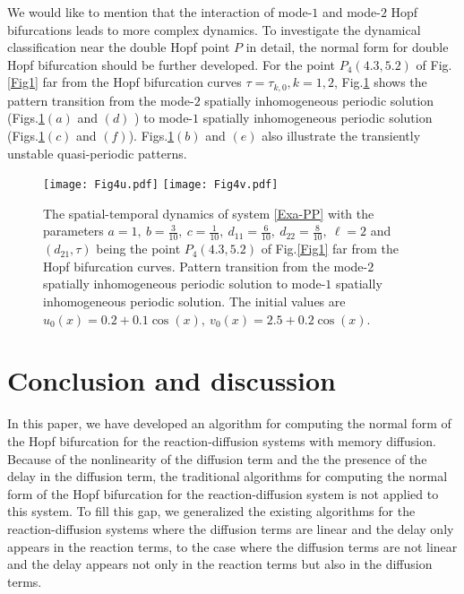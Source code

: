 \documentclass[11pt]{article}
\theoremstyle{definition}
\theoremstyle{remark}
\numberwithin{equation}{section}
\begin{document}
We would like to mention that  the interaction of  mode-$1$ and mode-$2$ Hopf bifurcations leads to more complex dynamics.    To investigate the dynamical classification near the double Hopf point $P$ in detail, the normal form for double Hopf bifurcation should be further developed.   For the point $P_4(4.3, 5.2)$ of  Fig.\ref{Fig1} far from the Hopf bifurcation curves $\tau=\tau_{k, 0}, k=1, 2$, Fig.\ref{Fig4} shows the pattern transition from the  mode-$2$ spatially inhomogeneous periodic solution (Figs.\ref{Fig4}$(a)$ and $(d)$  )  to mode-$1$ spatially inhomogeneous periodic solution (Figs.\ref{Fig4}$(c)$ and $(f)$). Figs.\ref{Fig4}$(b)$ and $(e)$ also illustrate the transiently unstable quasi-periodic patterns.


   \begin{figure}
\centering
 {\texttt{[image: Fig4u.pdf]}
 \texttt{[image: Fig4v.pdf]}}
  \caption{The spatial-temporal dynamics of system \eqref{Exa-PP}  with the parameters $a=1, ~b=\frac{3}{10}, ~c=\frac{1}{10}, ~d_{11}=\frac{6}{10}, ~d_{22}=\frac{8}{10},~\ell=2$ and  $\left(d_{21}, \tau\right)$ being the point $P_4(4.3, 5.2)$ of  Fig.\ref{Fig1} far from the Hopf bifurcation curves. Pattern transition from the  mode-$2$ spatially inhomogeneous periodic solution   to mode-$1$ spatially inhomogeneous periodic solution. The initial values are $u_0(x)=0.2+0.1\cos(x),~v_0(x)=2.5+0.2\cos(x)$.}
  \label{Fig4}
  \end{figure}

\section{Conclusion and discussion}\label{sec4}

In this paper, we have developed an algorithm for computing the normal form of the Hopf bifurcation for the reaction-diffusion systems with memory diffusion. Because of  the nonlinearity of the diffusion term  and the the presence of the delay in the diffusion term, the traditional  algorithms for computing the normal form of the Hopf bifurcation for the reaction-diffusion system is not applied to this system. To fill this gap, we generalized the existing algorithms for the reaction-diffusion systems where the diffusion terms are linear and the delay only appears in the reaction terms, to the case where the diffusion terms are not linear  and the delay appears not only in the reaction terms but also in the diffusion terms.
\end{document}
